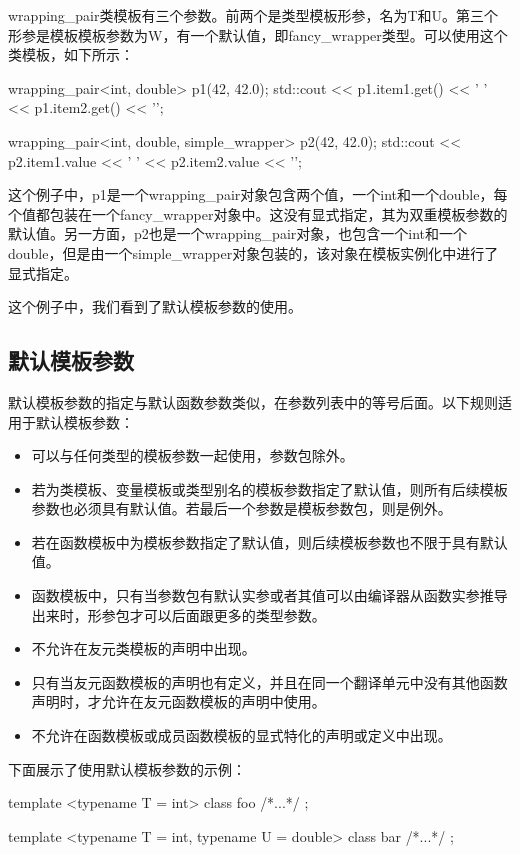 wrapping\_pair类模板有三个参数。前两个是类型模板形参，名为T和U。第三个形参是模板模板参数为W，有一个默认值，即fancy\_wrapper类型。可以使用这个类模板，如下所示：

\begin{cpp}
wrapping_pair<int, double> p1(42, 42.0);
std::cout << p1.item1.get() << ' '
		  << p1.item2.get() << '\n';

wrapping_pair<int, double, simple_wrapper> p2(42, 42.0);
std::cout << p2.item1.value << ' '
		  << p2.item2.value << '\n';
\end{cpp}

这个例子中，p1是一个wrapping\_pair对象包含两个值，一个int和一个double，每个值都包装在一个fancy\_wrapper对象中。这没有显式指定，其为双重模板参数的默认值。另一方面，p2也是一个wrapping\_pair对象，也包含一个int和一个double，但是由一个simple\_wrapper对象包装的，该对象在模板实例化中进行了显式指定。

这个例子中，我们看到了默认模板参数的使用。

\subsection{默认模板参数}

默认模板参数的指定与默认函数参数类似，在参数列表中的等号后面。以下规则适用于默认模板参数：

\begin{itemize}
  \item 可以与任何类型的模板参数一起使用，参数包除外。
  \item 若为类模板、变量模板或类型别名的模板参数指定了默认值，则所有后续模板参数也必须具有默认值。若最后一个参数是模板参数包，则是例外。
  \item 若在函数模板中为模板参数指定了默认值，则后续模板参数也不限于具有默认值。
  \item 函数模板中，只有当参数包有默认实参或者其值可以由编译器从函数实参推导出来时，形参包才可以后面跟更多的类型参数。
  \item 不允许在友元类模板的声明中出现。
  \item 只有当友元函数模板的声明也有定义，并且在同一个翻译单元中没有其他函数声明时，才允许在友元函数模板的声明中使用。
  \item 不允许在函数模板或成员函数模板的显式特化的声明或定义中出现。
\end{itemize}

下面展示了使用默认模板参数的示例：

\begin{cpp}
template <typename T = int>
class foo { /*...*/ };

template <typename T = int, typename U = double>
class bar { /*...*/ };
\end{cpp}

